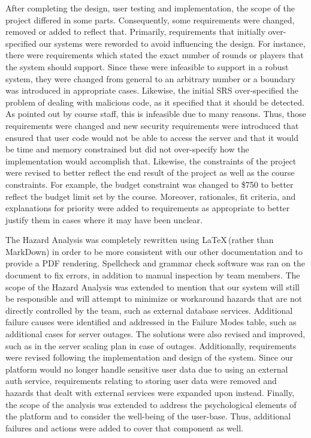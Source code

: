 \documentclass[12pt, titlepage]{article}
\begin{document}
After completing the design, user testing and implementation, the scope of the project differed in some parts. Consequently, some requirements were changed, removed or added to reflect that. Primarily, requirements that initially over-specified our systems were reworded to avoid influencing the design. For instance, there were requirements which stated the exact number of rounds or players that the system should support. Since these were infeasible to support in a robust system, they were changed from general to an arbitrary number or a boundary was introduced in appropriate cases. Likewise, the initial SRS over-specified the problem of dealing with malicious code, as it specified that it should be detected. As pointed out by course staff, this is infeasible due to many reasons. Thus, those requirements were changed and new security requirements were introduced that ensured that user code would not be able to access the server and that it would be time and memory constrained but did not over-specify how the implementation would accomplish that. Likewise, the constraints of the project were revised to better reflect the end result of the project as well as the course constraints. For example, the budget constraint was changed to \$750 to better reflect the budget limit set by the course. Moreover, rationales, fit criteria, and explanations for priority were added to requirements as appropriate to better justify them in cases where it may have been unclear.

The Hazard Analysis was completely rewritten using \LaTeX \,(rather than MarkDown) in order to be more consistent with our other documentation and to provide a PDF rendering. Spellcheck and grammar check software was ran on the document to fix errors, in addition to manual inspection by team members. The scope of the Hazard Analysis was extended to mention that our system will still be responsible and will attempt to minimize or workaround hazards that are not directly controlled by the team, such as external database services. Additional failure causes were identified and addressed in the Failure Modes table, such as additional cases for server outages. The solutions were also revised and improved, such as in the server scaling plan in case of outages. Additionally, requirements were revised following the implementation and design of the system. Since our platform would no longer handle sensitive user data due to using an external auth service, requirements relating to storing user data were removed and hazards that dealt with external services were expanded upon instead. Finally, the scope of the analysis was extended to address the psychological elements of the platform and to consider the well-being of the user-base. Thus, additional failures and actions were added to cover that component as well.
\end{document}

